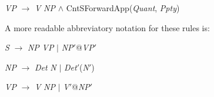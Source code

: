 \textit{VP} $\longrightarrow$ \textit{V} \textit{NP} \d{\d{$\wedge$}}
CntSForwardApp(\textit{Quant}, \textit{Ppty})

A more readable abbreviatory notation for these rules is:

\textit{S} $\longrightarrow$ \textit{NP} \textit{VP} $\mid$
\textit{NP}$'$@\textit{VP}$'$

\textit{NP} $\longrightarrow$ \textit{Det} \textit{N} $\mid$
\textit{Det}$'$(\textit{N}$'$)

\textit{VP} $\longrightarrow$ \textit{V} \textit{NP} $\mid$
\textit{V}$'$@\textit{NP}$'$

